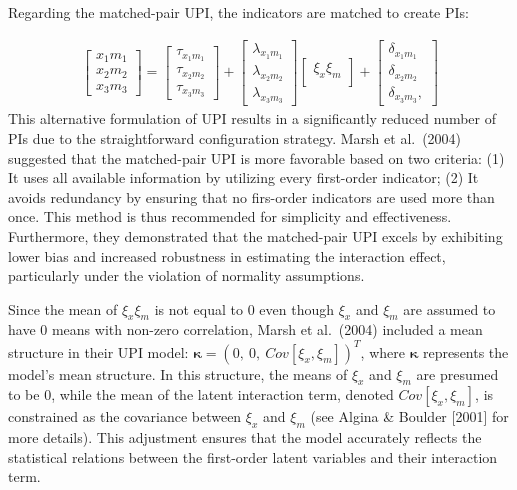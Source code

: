 \documentclass[
  man]{apa7}
\begin{document}
Regarding the matched-pair UPI, the indicators are matched to create PIs:

\begin{align}
    \begin{bmatrix}
        x_{1}m_{1} \\
        x_{2}m_{2} \\
        x_{3}m_{3}
    \end{bmatrix} =
    \begin{bmatrix}
        \tau_{x_{1}m_{1}} \\
        \tau_{x_{2}m_{2}} \\ 
        \tau_{x_{3}m_{3}}
    \end{bmatrix} + 
    \begin{bmatrix}
        \lambda_{x_{1}m_{1}} \\
        \lambda_{x_{2}m_{2}} \\ 
        \lambda_{x_{3}m_{3}} 
    \end{bmatrix}
    \begin{bmatrix}
        \xi_{x}\xi_{m} \\
    \end{bmatrix} +
    \begin{bmatrix}
        \delta_{x_{1}m_{1}} \\
        \delta_{x_{2}m_{2}} \\ 
        \delta_{x_{3}m_{3}},
    \end{bmatrix}
\end{align}
This alternative formulation of UPI results in a significantly reduced number of PIs due to the straightforward configuration strategy. Marsh et al.~(2004) suggested that the matched-pair UPI is more favorable based on two criteria: (1) It uses all available information by utilizing every first-order indicator; (2) It avoids redundancy by ensuring that no firs-order indicators are used more than once. This method is thus recommended for simplicity and effectiveness. Furthermore, they demonstrated that the matched-pair UPI excels by exhibiting lower bias and increased robustness in estimating the interaction effect, particularly under the violation of normality assumptions.

Since the mean of \(\xi_{x}\xi_{m}\) is not equal to 0 even though \(\xi_{x}\) and \(\xi_{m}\) are assumed to have 0 means with non-zero correlation, Marsh et al.~(2004) included a mean structure in their UPI model: \(\mathbf{\kappa} = (0,\ 0,\ Cov[\xi_{x}, \xi_{m}])^T\), where \(\mathbf{\kappa}\) represents the model's mean structure. In this structure, the means of \(\xi_{x}\) and \(\xi_{m}\) are presumed to be 0, while the mean of the latent interaction term, denoted \(Cov[\xi_{x}, \xi_{m}]\), is constrained as the covariance between \(\xi_{x}\) and \(\xi_{m}\) (see Algina \& Boulder {[}2001{]} for more details). This adjustment ensures that the model accurately reflects the statistical relations between the first-order latent variables and their interaction term.
\end{document}
